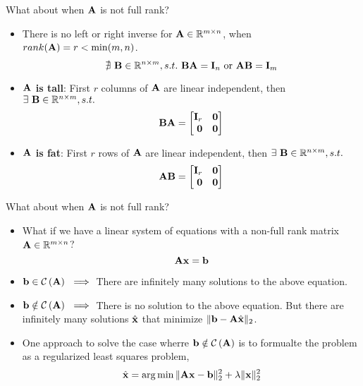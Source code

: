 \documentclass[aspectratio=169]{beamer}
\let\olditem\item
\renewcommand{\item}{\setlength{\itemsep}{\fill}\olditem}
\def\mf{\ensuremath\mathbf}
\def\mb{\ensuremath\mathbb}
\def\mc{\ensuremath\mathcal}
\def\lp{\ensuremath\left(}
\def\rp{\ensuremath\right)}
\def\bmx{\ensuremath\begin{bmatrix*}[r]}
\def\emx{\ensuremath\end{bmatrix*}}
\begin{document}
\begin{frame}[t]{What about when $\mf{A}$ is not full rank?}
\begin{itemize}
    \item There is no left or right inverse for $\mf{A} \in \mb{R}^{m \times n}$, when $rank(\mf{A}) = r < \min(m, n)$.
    \[ \nexists \,\, \mf{B} \in \mb{R}^{n \times m}, s.t. \,\, \mf{B}\mf{A} = \mf{I}_n \,\, \text{or} \,\, \mf{AB} = \mf{I}_m \]
    
    \item \textbf{$\mf{A}$ is tall}: First $r$ columns of $\mf{A}$ are linear independent, then  $\exists \,\, \mf{B} \in \mb{R}^{n \times m}, s.t.$
    \[\mf{BA} = \bmx \mf{I}_r & \mf{0} \\ \mf{0} & \mf{0} \emx \]
    
    \item \textbf{$\mf{A}$ is fat}: First $r$ rows of $\mf{A}$ are linear independent, then  $\exists \,\, \mf{B} \in \mb{R}^{n \times m}, s.t.$
    \[\mf{AB} = \bmx \mf{I}_r & \mf{0} \\ \mf{0} & \mf{0} \emx \]
    
\end{itemize}
\end{frame}


\begin{frame}[t]{What about when $\mf{A}$ is not full rank?}
\begin{itemize}
    \item What if we have a linear system of equations with a non-full rank matrix $\mf{A} \in \mb{R}^{m \times n}$?
    \[ \mf{Ax} = \mf{b} \]
    
    \item $\mf{b} \in \mathcal{C}\lp \mf{A} \rp \,\, \implies $ There are infinitely many solutions to the above equation.

    \item $\mf{b} \notin \mathcal{C}\lp \mf{A} \rp \,\, \implies $ There is no solution to the above equation. But there are infinitely many solutions $\hat{\mf{x}}$ that minimize $\Vert \mf{b} - \mf{A}\hat{\mf{x}} \Vert_2$.
    
    \item One approach to solve the case wherre $\mf{b} \notin \mc{C}\lp \mf{A} \rp$ is to formualte the problem as a regularized least squares problem,
    \[ \hat{\mf{x}} = \arg \min \Vert \mf{Ax} - \mf{b}\Vert_2^2 + \lambda \Vert \mf{x} \Vert_2^2 \]
\end{itemize}
\end{frame}
\end{document}
